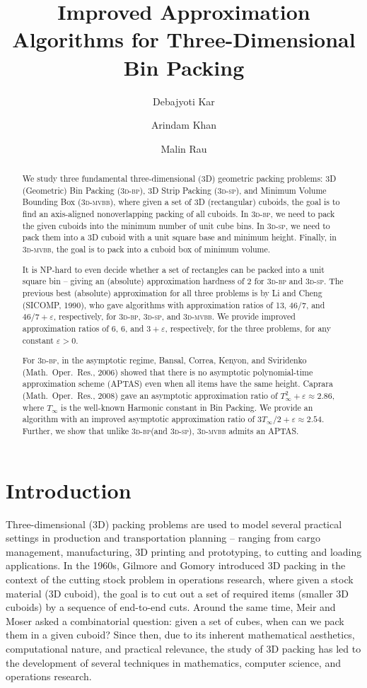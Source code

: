 \documentclass[a4paper,UKenglish,cleveref, autoref, thm-restate]{lipics-v2021}
\title{Improved Approximation Algorithms for Three-Dimensional Bin Packing}
\author{Debajyoti Kar}{Department of Computer Science and Automation, Indian Institute of Science, Bengaluru, India}{debajyotikar@iisc.ac.in}{https://orcid.org/0000-0003-4007-4648}{Debajyoti Kar is grateful to the Google PhD Fellowship Program.}
\author{Arindam Khan}{Department of Computer Science and Automation, Indian Institute of Science, Bengaluru, India}{arindamkhan@iisc.ac.in}{https://orcid.org/0000-0001-7505-1687}{Arindam Khan's research is supported in part by Google India Research Award, SERB Core Research Grant
(CRG/2022/001176) on “Optimization under Intractability and Uncertainty”, Ittiam Systems CSR grant, and the Walmart
Center for Tech Excellence at IISc (CSR Grant WMGT-23-0001). }
\author{Malin Rau}{Department of Mathematical Sciences, Chalmers University of Technology and University of Gothenburg, SE-412 96 Göteborg Sweden}{malin.rau@chalmers.se}{https://orcid.org/0000-0002-5710-560X}{}
\newcommand{\eps}{\varepsilon}
\newcommand{\tbp}{\textsc{3d-bp}\xspace}
\newcommand{\tsp}{\textsc{3d-sp}\xspace}
\newcommand{\tmvc}{\textsc{3d-mvbb}\xspace}
\begin{document}
\maketitle

\begin{abstract}
We study three fundamental three-dimensional (3D) geometric packing problems: 3D (Geometric) Bin Packing (\tbp), 3D Strip Packing (\tsp), and Minimum Volume Bounding Box (\tmvc), where given a set of  3D (rectangular) cuboids, the goal is to find an axis-aligned nonoverlapping packing of all cuboids.
In \tbp, we need to pack the given cuboids into the minimum number of unit cube bins. In \tsp, we need to pack them into a 3D cuboid with a unit square base and minimum height. Finally, in \tmvc, the goal is to pack into a cuboid box of minimum volume. 

It is NP-hard to even decide whether a set of rectangles can be packed into a unit square bin -- giving an (absolute) approximation hardness of 2 for \tbp and \tsp. The previous best (absolute) approximation for all three problems is by Li and Cheng (SICOMP, 1990), who gave algorithms with approximation ratios of 13, $46/7$, and $46/7+\eps$, respectively, for \tbp, \tsp, and \tmvc. We provide improved approximation ratios of 6, 6, and $3+\eps$, respectively, for the three problems, for any constant $\eps > 0$.

For \tbp, in the asymptotic regime, Bansal, Correa, Kenyon, and Sviridenko  (Math.~Oper.~Res., 2006) showed that there is no asymptotic polynomial-time approximation scheme (APTAS) even when all items have the same height. Caprara (Math.~Oper.~Res., 2008) gave an asymptotic approximation ratio of $T_{\infty}^2 + \eps\approx 2.86$, where $T_{\infty}$ is the well-known Harmonic constant in Bin Packing. We provide an algorithm with an improved asymptotic approximation ratio of $3 T_{\infty}/2 +\eps \approx 2.54$.
Further, we show that unlike \tbp (and \tsp), \tmvc admits an APTAS.
\end{abstract}






\section{Introduction}
\label{sec:intro}
Three-dimensional (3D) packing problems are used to model several practical settings in production and transportation planning -- ranging from cargo management, manufacturing, 3D printing and prototyping, to cutting and loading applications. In the 1960s, Gilmore and Gomory \cite{gilmore1965multistage} introduced 3D packing in the context of the cutting stock problem in operations research, where given a stock material (3D cuboid), the goal is to cut out a set of required items (smaller 3D cuboids) by a sequence of end-to-end cuts. Around the same time, Meir and Moser \cite{meir1968packing} asked a combinatorial question: given a set of cubes, when can we pack them in a given cuboid? Since then, due to its inherent mathematical aesthetics, computational nature, and practical relevance, the study of 3D packing has led to the development of several techniques in mathematics, computer science, and operations research.
\end{document}
